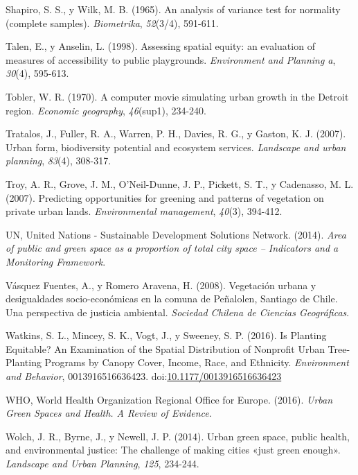 \documentclass[12pt,a4paper,openany]{book}
\theoremstyle{definition}
\theoremstyle{definition}
\theoremstyle{definition}
\theoremstyle{remark}
\begin{document}
\hypertarget{ref-shapiro1965analysis}{}
Shapiro, S. S., y Wilk, M. B. (1965). An analysis of variance test for
normality (complete samples). \emph{Biometrika}, \emph{52}(3/4),
591-611.

\hypertarget{ref-talen_assessing_1998}{}
Talen, E., y Anselin, L. (1998). Assessing spatial equity: an evaluation
of measures of accessibility to public playgrounds. \emph{Environment
and Planning a}, \emph{30}(4), 595-613.

\hypertarget{ref-tobler1970computer}{}
Tobler, W. R. (1970). A computer movie simulating urban growth in the
Detroit region. \emph{Economic geography}, \emph{46}(sup1), 234-240.

\hypertarget{ref-tratalos_urban_2007}{}
Tratalos, J., Fuller, R. A., Warren, P. H., Davies, R. G., y Gaston, K.
J. (2007). Urban form, biodiversity potential and ecosystem services.
\emph{Landscape and urban planning}, \emph{83}(4), 308-317.

\hypertarget{ref-troy_predicting_2007}{}
Troy, A. R., Grove, J. M., O'Neil-Dunne, J. P., Pickett, S. T., y
Cadenasso, M. L. (2007). Predicting opportunities for greening and
patterns of vegetation on private urban lands. \emph{Environmental
management}, \emph{40}(3), 394-412.

\hypertarget{ref-un2014sdg}{}
UN, United Nations - Sustainable Development Solutions Network. (2014).
\emph{Area of public and green space as a proportion of total city space
-- Indicators and a Monitoring Framework}.

\hypertarget{ref-vasquez_fuentes_vegetacion_2008}{}
Vásquez Fuentes, A., y Romero Aravena, H. (2008). Vegetación urbana y
desigualdades socio-económicas en la comuna de Peñalolen, Santiago de
Chile. Una perspectiva de justicia ambiental. \emph{Sociedad Chilena de
Ciencias Geográficas}.

\hypertarget{ref-watkins_is_2016}{}
Watkins, S. L., Mincey, S. K., Vogt, J., y Sweeney, S. P. (2016). Is
Planting Equitable? An Examination of the Spatial Distribution of
Nonprofit Urban Tree-Planting Programs by Canopy Cover, Income, Race,
and Ethnicity. \emph{Environment and Behavior}, 0013916516636423.
doi:\href{https://doi.org/10.1177/0013916516636423}{10.1177/0013916516636423}

\hypertarget{ref-who2016urban}{}
WHO, World Health Organization Regional Office for Europe. (2016).
\emph{Urban Green Spaces and Health. A Review of Evidence}.

\hypertarget{ref-wolch_urban_2014}{}
Wolch, J. R., Byrne, J., y Newell, J. P. (2014). Urban green space,
public health, and environmental justice: The challenge of making cities
«just green enough». \emph{Landscape and Urban Planning}, \emph{125},
234-244.
\end{document}
